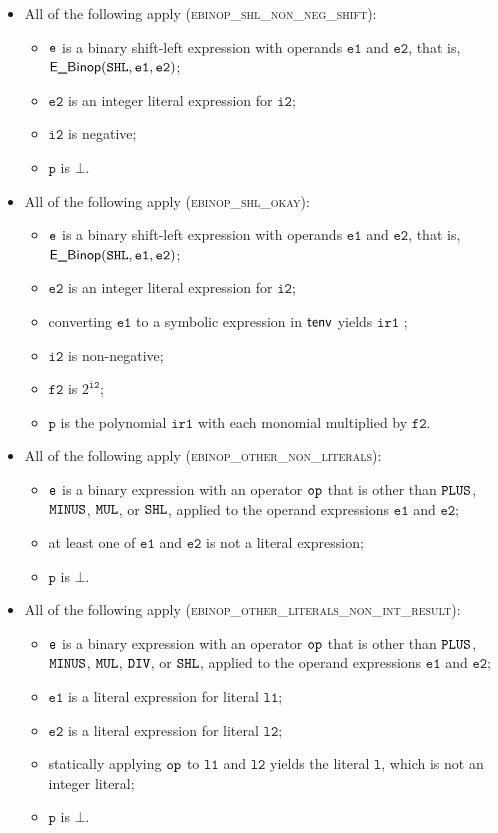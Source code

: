 \documentclass{book}
\newcommand\vitwo[0]{\texttt{i2}}
\newcommand\vftwo[0]{\texttt{f2}}
\newcommand\vl[0]{\texttt{l}}
\newcommand\vp[0]{\texttt{p}}
\newcommand\veone[0]{\texttt{e1}}
\newcommand\vetwo[0]{\texttt{e2}}
\newcommand\irone[0]{\texttt{ir1}}
\newcommand\vlone[0]{\texttt{l1}}
\newcommand\vltwo[0]{\texttt{l2}}
\begin{document}
\begin{itemize}
  \item All of the following apply (\textsc{ebinop\_shl\_non\_neg\_shift}):
  \begin{itemize}
    \item $\texttt{e}$ is a binary shift-left expression with operands $\veone$ and $\vetwo$, that is, \\ $\EBinop(\SHL, \veone, \vetwo)$;
    \item $\vetwo$ is an integer literal expression for $\vitwo$;
    \item $\vitwo$ is negative;
    \item $\vp$ is $\bot$.
  \end{itemize}

  \item All of the following apply (\textsc{ebinop\_shl\_okay}):
  \begin{itemize}
    \item $\texttt{e}$ is a binary shift-left expression with operands $\veone$ and $\vetwo$, that is, \\ $\EBinop(\SHL, \veone, \vetwo)$;
    \item $\vetwo$ is an integer literal expression for $\vitwo$;
    \item converting $\veone$ to a symbolic expression in $\textsf{tenv}$ yields $\irone$ \ProseOrTypeErrorOrBot;
    \item $\vitwo$ is non-negative;
    \item $\vftwo$ is $2^{\vitwo}$;
    \item $\vp$ is the polynomial $\irone$ with each monomial multiplied by $\vftwo$.
  \end{itemize}

  \item All of the following apply (\textsc{ebinop\_other\_non\_literals}):
  \begin{itemize}
    \item $\texttt{e}$ is a binary expression with an operator $\texttt{op}$ that is other than $\texttt{PLUS}$, $\texttt{MINUS}$, $\texttt{MUL}$, or $\texttt{SHL}$,
          applied to the operand expressions $\veone$ and $\vetwo$;
    \item at least one of $\veone$ and $\vetwo$ is not a literal expression;
    \item $\vp$ is $\bot$.
  \end{itemize}

  \item All of the following apply (\textsc{ebinop\_other\_literals\_non\_int\_result}):
  \begin{itemize}
    \item $\texttt{e}$ is a binary expression with an operator $\texttt{op}$ that is other than $\texttt{PLUS}$, $\texttt{MINUS}$, $\texttt{MUL}$, $\texttt{DIV}$, or $\texttt{SHL}$,
          applied to the operand expressions $\veone$ and $\vetwo$;
    \item $\veone$ is a literal expression for literal $\vlone$;
    \item $\vetwo$ is a literal expression for literal $\vltwo$;
    \item statically applying $\texttt{op}$ to $\vlone$ and $\vltwo$ yields the literal $\vl$, which is not an integer literal;
    \item $\vp$ is $\bot$.
  \end{itemize}


\end{itemize}
\end{document}
